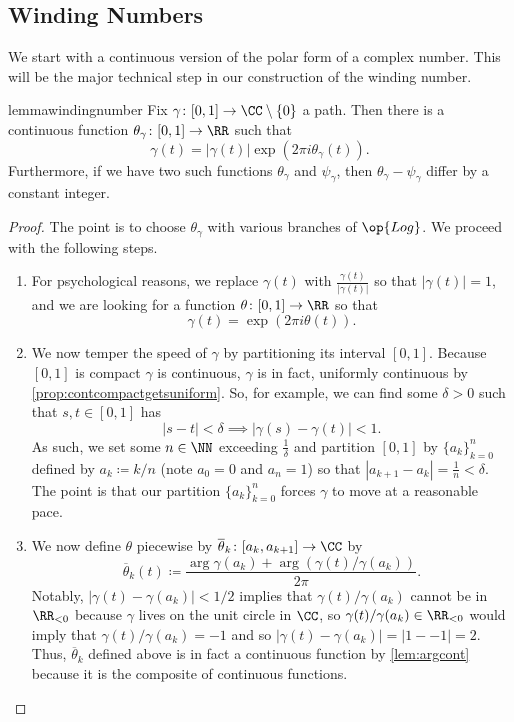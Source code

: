 \documentclass[../notes.tex]{subfiles}
\begin{document}
\subsection{Winding Numbers}
We start with a continuous version of the polar form of a complex number. This will be the major technical step in our construction of the winding number.
\begin{restatable}{lemma}{windingnumber} \label{lem:byhandwinding}
	Fix $\gamma\colon [0,1]\to\CC\setminus\{0\}$ a path. Then there is a continuous function $\theta_\gamma\colon [0,1]\to\RR$ such that
	\[\gamma(t)=|\gamma(t)|\exp(2\pi i\theta_\gamma(t)).\]
	Furthermore, if we have two such functions $\theta_\gamma$ and $\psi_\gamma$, then $\theta_\gamma-\psi_\gamma$ differ by a constant integer.
\end{restatable}
\begin{proof}
	The point is to choose $\theta_\gamma$ with various branches of $\op{Log}$. We proceed with the following steps.
	\begin{enumerate}
		\item For psychological reasons, we replace $\gamma(t)$ with $\frac{\gamma(t)}{|\gamma(t)|}$ so that $\left|\gamma(t)\right|=1$, and we are looking for a function $\theta\colon [0,1]\to\RR$ so that
		\[\gamma(t)=\exp(2\pi i\theta(t)).\]
		\item We now temper the speed of $\gamma$ by partitioning its interval $[0,1]$. Because $[0,1]$ is compact $\gamma$ is continuous, $\gamma$ is in fact, uniformly continuous by \autoref{prop:contcompactgetsuniform}. So, for example, we can find some $\delta>0$ such that $s,t\in[0,1]$ has
		\[|s-t|<\delta\implies|\gamma(s)-\gamma(t)|<1.\]
		As such, we set some $n\in\NN$ exceeding $\frac1\delta$ and partition $[0,1]$ by $\{a_k\}_{k=0}^n$ defined by $a_k\coloneqq k/n$ (note $a_0=0$ and $a_n=1$) so that $|a_{k+1}-a_k|=\frac1n<\delta$. The point is that our partition $\{a_k\}_{k=0}^n$ forces $\gamma$ to move at a reasonable pace.
		\item We now define $\theta$ piecewise by $\overline\theta_k\colon [a_k,a_{k+1}]\to\CC$ by
		\[\overline\theta_k(t)\coloneqq \frac{\arg\gamma(a_k)+\arg(\gamma(t)/\gamma(a_k))}{2\pi}.\]
		Notably, $|\gamma(t)-\gamma(a_k)|<1/2$ implies that $\gamma(t)/\gamma(a_k)$ cannot be in $\RR_{<0}$ because $\gamma$ lives on the unit circle in $\CC$, so $\gamma(t)/\gamma(a_k)\in\RR_{<0}$ would imply that $\gamma(t)/\gamma(a_k)=-1$ and so $|\gamma(t)-\gamma(a_k)|=|1--1|=2$. Thus, $\overline\theta_k$ defined above is in fact a continuous function by \autoref{lem:argcont} because it is the composite of continuous functions.


\end{enumerate}
\end{proof}
\end{document}
